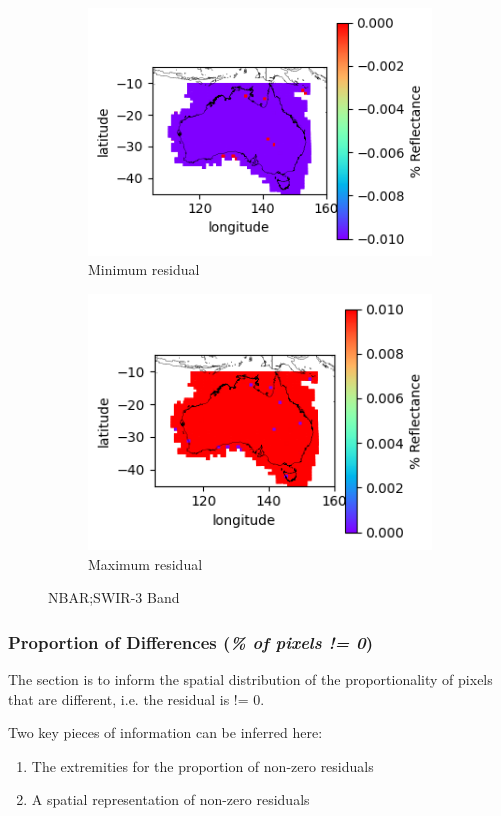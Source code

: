 \documentclass[a4paper]{article}
\begin{document}
      \begin{figure}[h!]
        \centering
          \begin{subfigure}[l]{.4\linewidth}
            \hspace{-32mm}
            \includegraphics[scale=0.9]{plots/nbar/nbar_swir_3-MinResidual.png}
            \caption{Minimum residual}
          \end{subfigure}
%
          \begin{subfigure}[r]{.4\linewidth}
            \includegraphics[scale=0.9]{plots/nbar/nbar_swir_3-MaxResidual.png}
            \caption{Maximum residual}
          \end{subfigure}
        \caption{NBAR;\@ SWIR-3 Band}\label{figure:22}
      \end{figure}

  \clearpage

    \subsubsection{Proportion of Differences (\textit{\% of pixels != 0})}

      \begin{flushleft}
        The section is to inform the spatial distribution of the proportionality of pixels that are different, i.e. the residual is != 0. \par
        Two key pieces of information can be inferred here:
        \begin{enumerate}
          \item The extremities for the proportion of non-zero residuals
          \item A spatial representation of non-zero residuals
        \end{enumerate}
      \end{flushleft}
\end{document}
